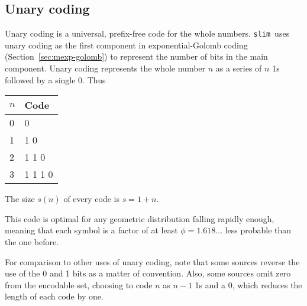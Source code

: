 \documentclass[11pt]{article}
\newcommand{\slim}{{\tt slim}}
\begin{document}
\subsection{Unary coding}
Unary coding is a universal, prefix-free code for the whole numbers.
\slim\ uses unary coding as the first component in exponential-Golomb
coding (Section~\ref{sec:mexp-golomb}) to represent the number of bits
in the main component.  Unary coding represents the whole number $n$
as a series of $n$ 1s followed by a single 0.  Thus
\newline \hspace*{1in}
\begin{tabular}{ll}
$n$ & Code \\ \hline
0 & 0 \\
1 & 1 0 \\
2 & 1 1 0 \\
3 & 1 1 1 0 \\
\end{tabular}
\newline
The size $s(n)$ of every code is $s = 1+n$.

This code is optimal for any geometric distribution falling rapidly
enough, meaning that each symbol is a factor of at least
$\phi=1.618...$ less probable than the one before.  

For comparison to other uses of unary coding, note that some sources
reverse the use of the 0 and 1 bits as a matter of convention.  Also,
some sources omit zero from the encodable set, choosing to code $n$ as
$n-1$ 1s and a 0, which reduces the length of each code by one.



\end{document}
